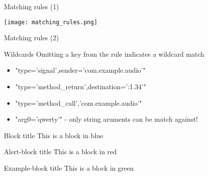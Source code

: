 \documentclass{beamer}
\begin{document}
\begin{frame}{Matching rules (1)}
  \begin{center}
    \texttt{[image: matching\_rules.png]}
  \end{center}
\end{frame}

\begin{frame}{Matching rules (2)}
\begin{block}{Wildcards}
Omitting a key from the rule indicates a wildcard match
\end{block}
\vfill
\pause
  \begin{itemize}
    \item "type='signal',sender='com.example.audio'"
    \item "type='method\_return',destination=':1.34'"
    \item "type='method\_call','com.example.audio'"
    \item "arg0='qwerty'" - only string aruments can be match against!
  \end{itemize}
\end{frame}

\begin{frame}

\begin{block}{Block title}
This is a block in blue
\end{block}

\begin{alertblock}{Alert-block title}
This is a block in red
\end{alertblock}

\begin{exampleblock}{Example-block title}
This is a block in green
\end{exampleblock}
\end{frame}
\end{document}

